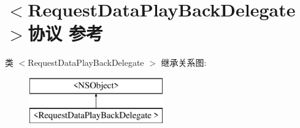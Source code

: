 \hypertarget{protocol_request_data_play_back_delegate_01-p}{}\section{$<$Request\+Data\+Play\+Back\+Delegate $>$协议 参考}
\label{protocol_request_data_play_back_delegate_01-p}
类 $<$Request\+Data\+Play\+Back\+Delegate $>$ 继承关系图\+:\begin{figure}[H]
\begin{center}
\leavevmode
\includegraphics[height=2.000000cm]{protocol_request_data_play_back_delegate_01-p}
\end{center}
\end{figure}

